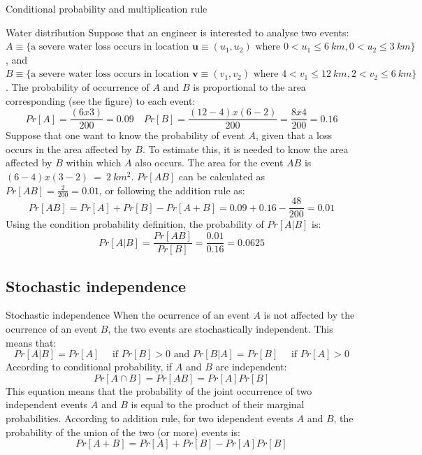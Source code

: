 \documentclass[8pt]{beamer}
\renewcommand{\emph}[1]{\textcolor{myorange}{#1}}
\begin{document}
\begin{frame}{Conditional probability and multiplication rule}
    \begin{exampleblock}{Water distribution}
        Suppose that an engineer is interested to analyse two events: $A \equiv \{ \text{a severe water loss occurs in location } \mathbf{u} \equiv (u_1 , u_2) \text{ where } 0 < u_1 \leq 6 \ km, 0 < u_2 \leq 3 \ km\}$, and   $B \equiv \{ \text{a severe water loss occurs in location } \mathbf{v} \equiv (v_1 , v_2) \text{ where } 4 < v_1 \leq 12 \ km, 2 < v_2 \leq 6 \ km\}$. The probability of occurrence of $A$ and $B$ is proportional to the area corresponding  (see the figure) to each event:
        $$
        Pr[A] = \frac{(6 x 3)}{200} = 0.09 \quad Pr[B] = \frac{(12 - 4) x (6 - 2)}{200} = \frac{8 x 4}{200} = 0.16
        $$
        Suppose that one want to know the probability of event $A$, given that a loss occurs in the area affected by $B$. To estimate this, it is needed to know the area affected by $B$ within which $A$ also occurs. The area for the event $AB$ is $(6 - 4) x (3 - 2) \ = \ 2 \ km^2 $. $Pr[AB]$ can be calculated as $Pr[AB] = \frac{2}{200} = 0.01$, or following the addition rule as:
$$
Pr[AB] = Pr[A] + Pr[B] - Pr[A + B] = 0.09 + 0.16 - \frac{48}{200} = 0.01
$$
Using the condition probability definition, the probability of $Pr[A | B]$ is:
    $$
    Pr[A | B] = \frac{Pr[AB]}{Pr[B]} = \frac{0.01}{0.16} = 0.0625
    $$
    \end{exampleblock}
\end{frame}

\subsection{Stochastic independence}
\begin{frame}{Stochastic independence}
    When the ocurrence of an event $A$ is not affected by the ocurrence of an event $B$, the two events are \emph{stochastically independent}. This means that:
    $$
    Pr[A | B] = Pr[A] \quad \text{ if } Pr[B] > 0 \text{ and } Pr[B | A] = Pr[B] \quad \text{ if } Pr[A] > 0
    $$
    According to conditional probability, if $A$ and $B$ are independent:
    $$
    Pr[A \cap B] = Pr[AB] = Pr[A] Pr[B]
    $$
    This equation means that the probability of the joint occurrence of two independent events $A$ and $B$ is equal to the product of their marginal probabilities. According to addition rule, for two idependent events $A$ and $B$, the probability of the union of the two (or more) events is:
    $$
    Pr[A + B] = Pr[A] + Pr[B] - Pr[A] Pr[B]
    $$
\end{frame}
\end{document}
